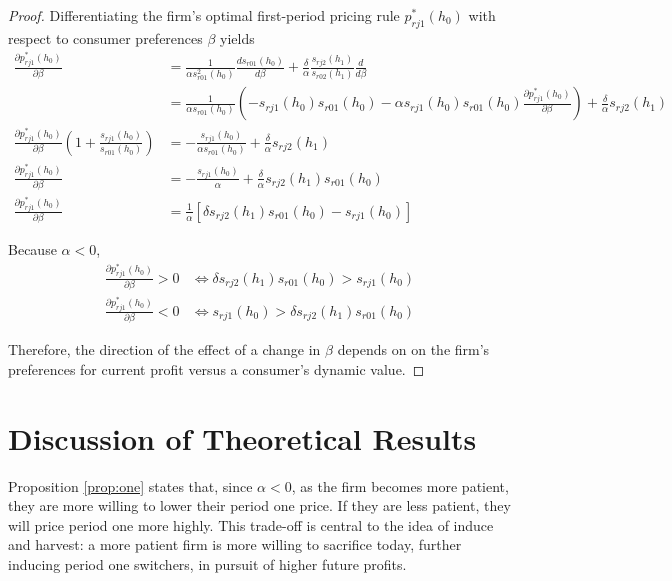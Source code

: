 \documentclass[12pt]{article}
\theoremstyle{definition}
\theoremstyle{remark}
\begin{document}
\begin{proof}
  Differentiating the firm's optimal first-period pricing rule $p_{rj1}^*(h_0)$
  with respect to consumer preferences $\beta$ yields
  \begin{align*}
    \frac{\partial p_{rj1}^*(h_0)}{\partial\beta} &= \frac{1}{\alpha s_{r01}^2(h_0)}\frac{ds_{r01}(h_0)}{d\beta} + \frac{\delta}{\alpha}\frac{s_{rj2}(h_1)}{s_{r02}(h_1)}\frac{d}{d\beta}\\
    &=\frac{1}{\alpha s_{r01}(h_0)}(-s_{rj1}(h_0)s_{r01}(h_0) - \alpha
    s_{rj1}(h_0)s_{r01}(h_0)\frac{\partial p^*_{rj1}(h_0)}{\partial\beta}) +
    \frac{\delta}{\alpha}s_{rj2}(h_1)
    \\
    \frac{\partial
    p_{rj1}^*(h_0)}{\partial\beta}(1+\frac{s_{rj1}(h_0)}{s_{r01}(h_0)}) &=
    -\frac{s_{rj1}(h_0)}{\alpha s_{r01}(h_0)} +
    \frac{\delta}{\alpha}s_{rj2}(h_1) \\
    \frac{\partial p_{rj1}^*(h_0)}{\partial\beta} &=
    -\frac{s_{rj1}(h_0)}{\alpha} + \frac{\delta}{\alpha}s_{rj2}(h_1)s_{r01}(h_0)\\
    \frac{\partial p_{rj1}^*(h_0)}{\partial\beta} &=
    \frac{1}{\alpha}[\delta s_{rj2}(h_1)s_{r01}(h_0) - s_{rj1}(h_0)]
  \end{align*}

  Because $\alpha<0$,
  \begin{align}
    \frac{\partial p_{rj1}^*(h_0)}{\partial\beta} > 0 &\iff \delta
    s_{rj2}(h_1)s_{r01}(h_0) > s_{rj1}(h_0) \\
    \frac{\partial p_{rj1}^*(h_0)}{\partial\beta} < 0 &\iff s_{rj1}(h_0) > \delta
    s_{rj2}(h_1)s_{r01}(h_0)
  \end{align}

  Therefore, the direction of the effect of a change in $\beta$ depends on on
  the firm's preferences for current profit versus a consumer's dynamic value.
\end{proof}


\section{Discussion of Theoretical Results}
\label{sec:theory-discussion}

Proposition \ref{prop:one} states that, since $\alpha < 0$, as the firm becomes more patient, they are more willing to
lower their period one price. If they are less patient, they will price period
one more highly. This trade-off is central to the idea of induce and harvest: a
more patient firm is more willing to sacrifice today, further inducing period
one switchers, in pursuit of higher future profits.
\end{document}
